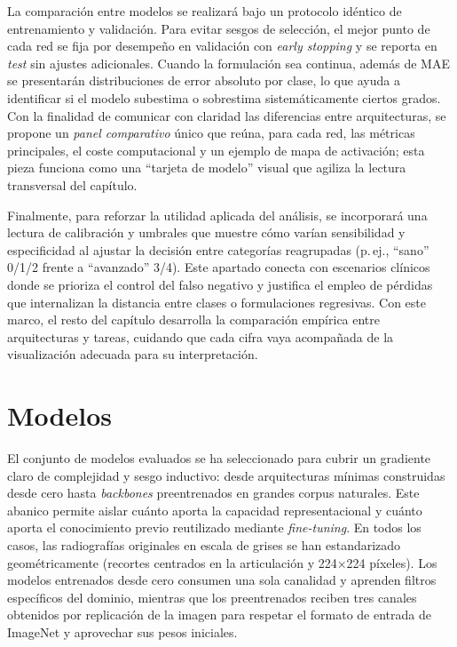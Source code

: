 \documentclass[11pt,spanish,listoffigures,listoftables]{tfgetsinf}
\begin{document}
La comparación entre modelos se realizará bajo un protocolo idéntico de
entrenamiento y validación. Para evitar sesgos de selección, el mejor punto de
cada red se fija por desempeño en validación con \emph{early stopping} y se
reporta en \emph{test} sin ajustes adicionales. Cuando la formulación sea
continua, además de MAE se presentarán distribuciones de error absoluto por
clase, lo que ayuda a identificar si el modelo subestima o sobrestima
sistemáticamente ciertos grados. Con la finalidad de comunicar con claridad las
diferencias entre arquitecturas, se propone un \emph{panel comparativo} único
que reúna, para cada red, las métricas principales, el coste computacional y un
ejemplo de mapa de activación; esta pieza funciona como una “tarjeta de modelo”
visual que agiliza la lectura transversal del capítulo.

Finalmente, para reforzar la utilidad aplicada del análisis, se incorporará una
lectura de calibración y umbrales que muestre cómo varían sensibilidad y
especificidad al ajustar la decisión entre categorías reagrupadas (p.\,ej.,
“sano” 0/1/2 frente a “avanzado” 3/4). Este apartado conecta con escenarios
clínicos donde se prioriza el control del falso negativo y justifica el empleo
de pérdidas que internalizan la distancia entre clases o formulaciones
regresivas. Con este marco, el resto del capítulo desarrolla la comparación
empírica entre arquitecturas y tareas, cuidando que cada cifra vaya acompañada
de la visualización adecuada para su interpretación.

\section{Modelos}
\label{sec:modelos_cnn}

El conjunto de modelos evaluados se ha seleccionado para cubrir un gradiente
claro de complejidad y sesgo inductivo: desde arquitecturas mínimas construidas
desde cero hasta \emph{backbones} preentrenados en grandes corpus naturales.
Este abanico permite aislar cuánto aporta la capacidad representacional y
cuánto aporta el conocimiento previo reutilizado mediante \emph{fine-tuning}.
En todos los casos, las radiografías originales en escala de grises se han
estandarizado geométricamente (recortes centrados en la articulación y
\mbox{224$\times$224} píxeles). Los modelos entrenados desde cero consumen una
sola canalidad y aprenden filtros específicos del dominio, mientras que los
preentrenados reciben tres canales obtenidos por replicación de la imagen para
respetar el formato de entrada de ImageNet y aprovechar sus pesos
iniciales.
\end{document}
